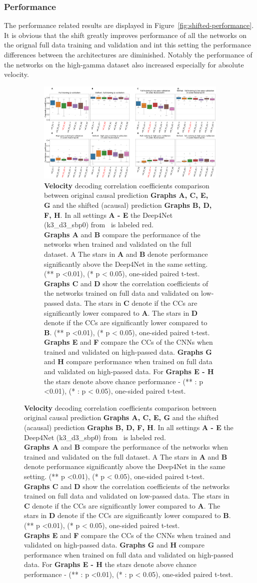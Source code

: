 \subsubsection{Performance}
The performance related results are displayed in Figure~\ref{fig:shifted-performance}.
It is obvious that the shift greatly improves performance of all the networks on the orignal full data training and validation and int this setting the performance differences between the architectures are diminished.
Notably the performance of the networks on the high-gamma dataset also increased especially for absolute velocity.
\begin{figure}[!htpb]
\centering
\begin{subfigure}[t]{\textwidth}
   \includegraphics[width=1\linewidth]{img/ch4/shifted_vs_non_shifted_vel_performance_comparison}
   \caption{\textbf{Velocity} decoding correlation coefficients comparison between original causal prediction \textbf{Graphs A, C, E, G} and the shifted (acausal) prediction \textbf{Graphs B, D, F, H}. In all settings \textbf{
   A - E} the Deep4Net (k3\_d3\_sbp0) from~\cite{Hammer-2021} is labeled red.\\ \textbf{Graphs A} and \textbf{B} compare the performance of the networks when trained and validated on the full dataset. A The stars in \textbf{A} and \textbf{B} denote performance significantly above the Deep4Net in the same setting. (** p <0.01), (* p < 0.05), one-sided paired t-test.
   \\\textbf{Graphs C} and \textbf{D} show the correlation coefficients of the networks trained on full data and validated on low-passed data. 
   The stars in \textbf{C} denote if the CCs are significantly lower compared to \textbf{A}. The stars in \textbf{D} denote if the CCs are significantly lower compared to \textbf{B}. (** p <0.01), (* p < 0.05), one-sided paired t-test.
   \\\textbf{Graphs E} and \textbf{F} compare the CCs of the CNNs when trained and validated on high-passed data. \textbf{Graphs G} and \textbf{H} compare performance when trained on full data and validated on high-passed data. For \textbf{Graphs E - H} the stars denote above chance performance - (** : p <0.01), (* : p < 0.05), one-sided paired t-test.}
   \label{fig:shifted-performance-vel}
\end{subfigure}
\end{figure}
\clearpage   

